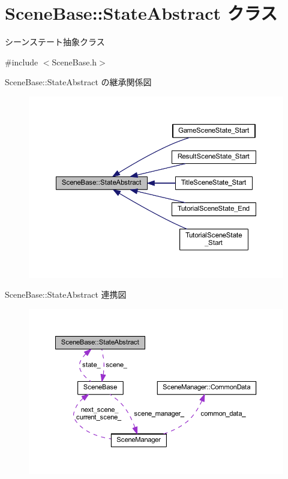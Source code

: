 \hypertarget{class_scene_base_1_1_state_abstract}{}\section{Scene\+Base\+:\+:State\+Abstract クラス}
\label{class_scene_base_1_1_state_abstract}


シーンステート抽象クラス  




{\ttfamily \#include $<$Scene\+Base.\+h$>$}



Scene\+Base\+:\+:State\+Abstract の継承関係図\nopagebreak
\begin{figure}[H]
\begin{center}
\leavevmode
\includegraphics[width=350pt]{class_scene_base_1_1_state_abstract__inherit__graph}
\end{center}
\end{figure}


Scene\+Base\+:\+:State\+Abstract 連携図\nopagebreak
\begin{figure}[H]
\begin{center}
\leavevmode
\includegraphics[width=350pt]{class_scene_base_1_1_state_abstract__coll__graph}
\end{center}
\end{figure}
